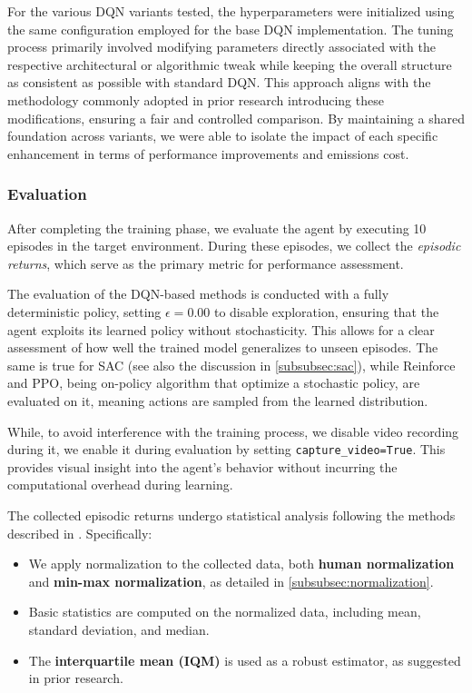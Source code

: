 For the various DQN variants tested, the hyperparameters were initialized using the same configuration employed for the base DQN implementation. The tuning process primarily involved modifying parameters directly associated with the respective architectural or algorithmic tweak while keeping the overall structure as consistent as possible with standard DQN. This approach aligns with the methodology commonly adopted in prior research introducing these modifications, ensuring a fair and controlled comparison. By maintaining a shared foundation across variants, we were able to isolate the impact of each specific enhancement in terms of performance improvements and emissions cost.

\subsubsection{Evaluation}

After completing the training phase, we evaluate the agent by executing \num{10} episodes in the target environment. During these episodes, we collect the \textit{episodic returns}, which serve as the primary metric for performance assessment.

The evaluation of the DQN-based methods is conducted with a fully deterministic policy, setting $\epsilon = 0.00$ to disable exploration, ensuring that the agent exploits its learned policy without stochasticity. This allows for a clear assessment of how well the trained model generalizes to unseen episodes. The same is true for SAC (see also the discussion in \ref{subsubsec:sac}), while Reinforce and PPO, being on-policy algorithm that optimize a stochastic policy, are evaluated on it, meaning actions are sampled from the learned distribution.

While, to avoid interference with the training process, we disable video recording during it, we enable it during evaluation by setting \texttt{capture\_video=True}. This provides visual insight into the agent's behavior without incurring the computational overhead during learning.

The collected episodic returns undergo statistical analysis following the methods described in . Specifically:
\begin{itemize}
	\item We apply normalization to the collected data, both \textbf{human normalization} and \textbf{min-max normalization}, as detailed in \ref{subsubsec:normalization}.
	\item Basic statistics are computed on the normalized data, including mean, standard deviation, and median.
	\item The \textbf{interquartile mean (IQM)} is used as a robust estimator, as suggested in prior research.

\end{itemize}

